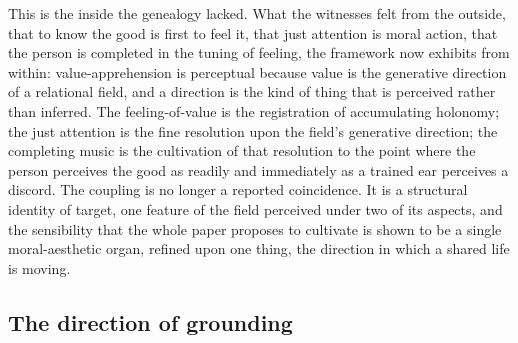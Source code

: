 
This is the inside the genealogy lacked. What the witnesses felt from the outside, that to know the good is first to feel it, that just attention is moral action, that the person is completed in the tuning of feeling, the framework now exhibits from within: value-apprehension is perceptual because value is the generative direction of a relational field, and a direction is the kind of thing that is perceived rather than inferred. The feeling-of-value is the registration of accumulating holonomy; the just attention is the fine resolution upon the field's generative direction; the completing music is the cultivation of that resolution to the point where the person perceives the good as readily and immediately as a trained ear perceives a discord. The coupling is no longer a reported coincidence. It is a structural identity of target, one feature of the field perceived under two of its aspects, and the sensibility that the whole paper proposes to cultivate is shown to be a single moral-aesthetic organ, refined upon one thing, the direction in which a shared life is moving.

\subsection{The direction of grounding}
\label{p22:sub:coupling-direction}

